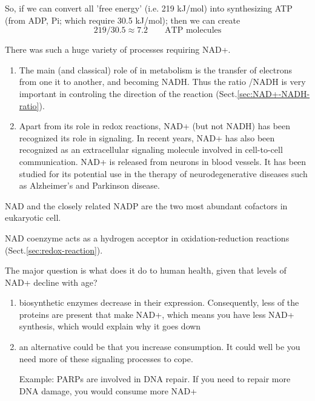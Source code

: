 \begin{enumerate}
\begin{mdframed}
So, if we can convert all 'free energy' (i.e. 219 kJ/mol) into synthesizing ATP
(from ADP, Pi; which require 30.5 kJ/mol); then we can create
\begin{equation}
219/30.5 \approx 7.2 \qquad \text{ATP molecules}
\end{equation}


\end{mdframed}

  
\end{enumerate}

There was such a huge variety of processes requiring NAD+. 
\begin{enumerate}
  \item  The main (and classical) role of  in metabolism is the transfer of electrons from
one it to another, and becoming NADH. Thus the ratio /NADH is very important
in controling the direction of the reaction (Sect.\ref{sec:NAD+-NADH-ratio}).

  \item Apart from its role in redox reactions, NAD+ (but not NADH) has been
  recognized
its role in signaling. In recent years, NAD+ has also been recognized
as an extracellular signaling molecule involved in cell-to-cell communication.
NAD+ is released from neurons in blood vessels.
It has been studied for its potential use in the therapy of neurodegenerative
diseases such as Alzheimer's and Parkinson disease.
\end{enumerate}


\begin{mdframed}

NAD and the closely related NADP
are the two most abundant cofactors in eukaryotic cell.

NAD coenzyme acts as a hydrogen acceptor in oxidation-reduction
reactions (Sect.\ref{sec:redox-reaction}).

\end{mdframed} 

The major question is
what does it do to human health, given that levels of NAD+ decline with age?

\begin{enumerate}
  
   \item biosynthetic enzymes decrease in their expression. Consequently, less of
the proteins are present that make NAD+, which means you have less NAD+
synthesis, which would explain why it goes down
  
  \item an alternative could be that you increase consumption. It could well be
  you need more of these signaling processes to cope.

Example: PARPs are involved in DNA repair. If you need to repair more DNA damage, you would consume more NAD+
\end{enumerate}

